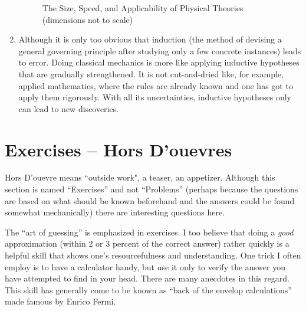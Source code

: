 \documentclass[12pt,a4paper]{report}
\begin{document}
\begin{enumerate}
\begin{figure}[h!]
            \caption{The Size, Speed, and Applicability of Physical Theories (dimensions not to scale)}
            \label{fig: size-speed}
        \end{figure}
    \item Although it is only too obvious that induction (the method of devising a general governing principle after studying only a few concrete instances) leads to error. Doing classical mechanics is more like applying inductive hypotheses that are gradually strengthened. It is not cut-and-dried like, for example, applied mathematics, where the rules are already known and one has got to apply them rigorously. With all its uncertainties, inductive hypotheses only can lead to new discoveries.
\end{enumerate}

\section{Exercises -- Hors D'ouevres}

Hors D'ouevre means ``outside work", a teaser, an appetizer. Although this section is named ``Exercises'' and not ``Problems'' (perhaps because the questions are based on what should be known beforehand and the answers could be found somewhat mechanically) there are interesting questions here.

The ``art of guessing'' \cite{polya-guessing} is emphasized in exercises. I too believe that doing a \emph{good} approximation (within 2 or 3 percent of the correct answer) rather quickly is a helpful skill that shows one's resourcefulness and understanding. One trick I often employ is to have a calculator handy, but use it only to verify the answer you have attempted to find in your head. There are many anecdotes in this regard. This skill has generally come to be known as ``back of the envelop calculations'' made famous by Enrico Fermi.





\appendix
\end{document}
